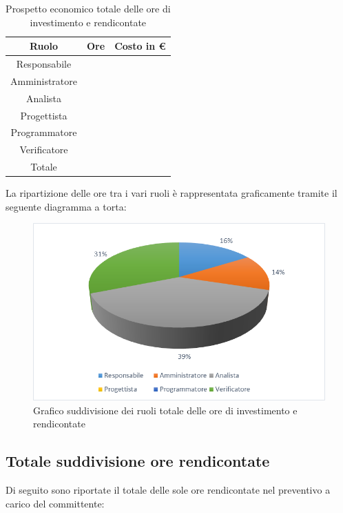 \documentclass[./PianodiProgetto.tex]{subfiles}
\begin{document}
\begin{table}[H]
	\centering
	\begin{tabular}{|c|c|c|}
		\hline
		Ruolo&Ore&Costo in € \\ \hline
		Responsabile& &  \\ \hline
		Amministratore& &  \\ \hline
		Analista& &  \\ \hline
		Progettista& &  \\ \hline
		Programmatore& &  \\ \hline
		Verificatore& &  \\ \hline
		Totale& & \\ \hline
	\end{tabular}
	\caption{Prospetto economico totale delle ore di investimento e rendicontate}
\end{table}

La ripartizione delle ore tra i vari ruoli è rappresentata graficamente tramite il seguente diagramma a torta:

\begin{figure}[H]
	\centering
	\includegraphics[width=1\linewidth]{img/grafici/OreInvestimentoRendicontateProspettoEconomico}
	\caption{Grafico suddivisione dei ruoli totale delle ore di investimento e rendicontate}
	\label{fig:ore-investimento-rendicontate-prospetto-economico}
\end{figure}


\subsection{Totale suddivisione ore rendicontate}
Di seguito sono riportate il totale delle sole ore rendicontate nel preventivo a carico del committente:
\end{document}
